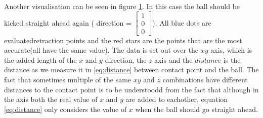 \documentclass[a4paper]{article}
\begin{document}
Another visualisation can be seen in figure \ref{fig:retraction_plot3}. In this
case the ball should be kicked straight ahead again ( direction = $\begin{bmatrix} 1 \\  0 \\ 0 \end{bmatrix}$). All blue dots are evaluatedretraction points and the red stars are the points that are the most
accurate(all have the same value). The data is set out over the $xy$ axis, which
is the added length of the $x$ and $y$ direction, the $z$ axis and the
$distance$ is the distance as we measure it in \ref{eq:distance} between contact point and the ball. The fact that sometimes multiple of the same $xy$ and $z$
combinations have different distances to the contact point is to be understoodd from
the fact that although in the axis both the real value of $x$ and $y$ are added to
eachother, equation \ref{eq:distance} only considers the value of $x$ when the ball should go
straight ahead.

\begin{figure}[htbp]
  \centering
  \caption{
         }
  \label{fig:retraction_plot3}
\end{figure}
\end{document}
